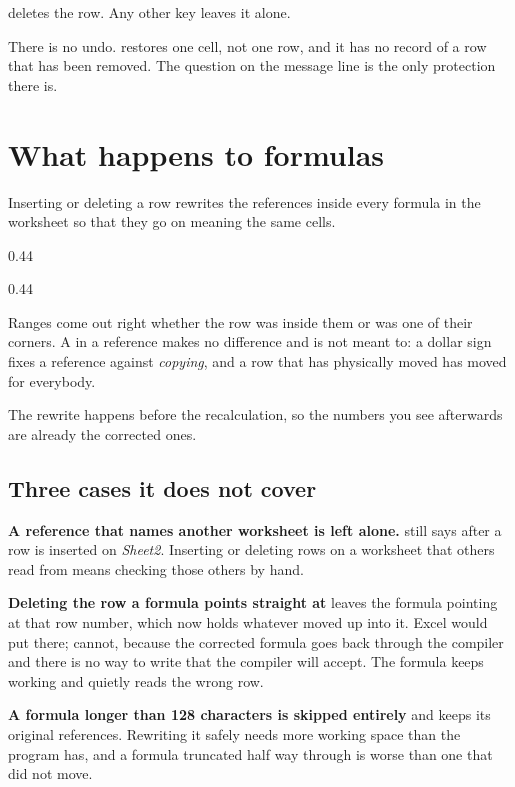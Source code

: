  deletes the row. Any other key leaves it alone.

\begin{cccaution}
There is no undo.  restores one cell, not one row, and it has no record
of a row that has been removed. The question on the message line is the only
protection there is.
\end{cccaution}

\section{What happens to formulas}

Inserting or deleting a row rewrites the references inside every formula in the
worksheet so that they go on meaning the same cells.

\begin{ccexamples}{0.44\linewidth}
\end{ccexamples}

\begin{ccexamples}{0.44\linewidth}
\end{ccexamples}

Ranges come out right whether the row was inside them or was one of their
corners. A \lit{\$} in a reference makes no difference and is not meant to: a
dollar sign fixes a reference against \emph{copying}, and a row that has
physically moved has moved for everybody.

The rewrite happens before the recalculation, so the numbers you see afterwards
are already the corrected ones.

\subsection{Three cases it does not cover}

\begin{cccaution}
\textbf{A reference that names another worksheet is left alone.} 
still says  after a row is inserted on \emph{Sheet2}. Inserting or
deleting rows on a worksheet that others read from means checking those others
by hand.

\textbf{Deleting the row a formula points straight at} leaves the formula
pointing at that row number, which now holds whatever moved up into it.
Excel would put  there; \ccprod{} cannot, because the corrected
formula goes back through the compiler and there is no way to write
 that the compiler will accept. The formula keeps working and
quietly reads the wrong row.

\textbf{A formula longer than 128 characters is skipped entirely} and keeps its
original references. Rewriting it safely needs more working space than the
program has, and a formula truncated half way through is worse than one that
did not move.
\end{cccaution}

